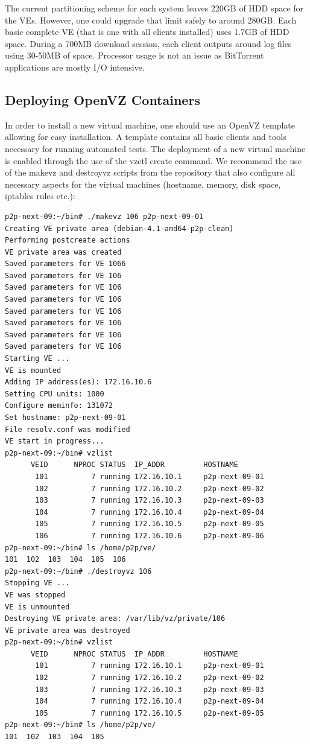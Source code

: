 The current partitioning scheme for each system leaves 220GB of HDD space for
the VEs. However, one could upgrade that limit safely to around 280GB. Each
basic complete VE (that is one with all clients installed) uses 1.7GB of HDD
space. During a 700MB download session, each client outputs around log files
using 30-50MB of space. Processor usage is not an issue as BitTorrent
applications are mostly I/O intensive.

\subsection{Deploying OpenVZ Containers}

In order to install a new virtual machine, one should use an OpenVZ template
allowing for easy installation. A template contains all basic clients and
tools necessary for running automated tests. The deployment of a new virtual
machine is enabled through the use of the vzctl create command. We recommend
the use of the makevz and destroyvz scripts from the repository that also
configure all necessary aspects for the virtual machines (hostname, memory,
disk space, iptables rules etc.):

\footnotesize
\begin{verbatim}
p2p-next-09:~/bin# ./makevz 106 p2p-next-09-01
Creating VE private area (debian-4.1-amd64-p2p-clean)
Performing postcreate actions
VE private area was created
Saved parameters for VE 1066
Saved parameters for VE 106
Saved parameters for VE 106
Saved parameters for VE 106
Saved parameters for VE 106
Saved parameters for VE 106
Saved parameters for VE 106
Saved parameters for VE 106
Starting VE ...
VE is mounted
Adding IP address(es): 172.16.10.6
Setting CPU units: 1000
Configure meminfo: 131072
Set hostname: p2p-next-09-01
File resolv.conf was modified
VE start in progress...
p2p-next-09:~/bin# vzlist
      VEID      NPROC STATUS  IP_ADDR         HOSTNAME
       101          7 running 172.16.10.1     p2p-next-09-01
       102          7 running 172.16.10.2     p2p-next-09-02
       103          7 running 172.16.10.3     p2p-next-09-03
       104          7 running 172.16.10.4     p2p-next-09-04
       105          7 running 172.16.10.5     p2p-next-09-05
       106          7 running 172.16.10.6     p2p-next-09-06
p2p-next-09:~/bin# ls /home/p2p/ve/
101  102  103  104  105  106
p2p-next-09:~/bin# ./destroyvz 106
Stopping VE ...
VE was stopped
VE is unmounted
Destroying VE private area: /var/lib/vz/private/106
VE private area was destroyed
p2p-next-09:~/bin# vzlist
      VEID      NPROC STATUS  IP_ADDR         HOSTNAME
       101          7 running 172.16.10.1     p2p-next-09-01
       102          7 running 172.16.10.2     p2p-next-09-02
       103          7 running 172.16.10.3     p2p-next-09-03
       104          7 running 172.16.10.4     p2p-next-09-04
       105          7 running 172.16.10.5     p2p-next-09-05
p2p-next-09:~/bin# ls /home/p2p/ve/
101  102  103  104  105
\end{verbatim}
\normalsize

